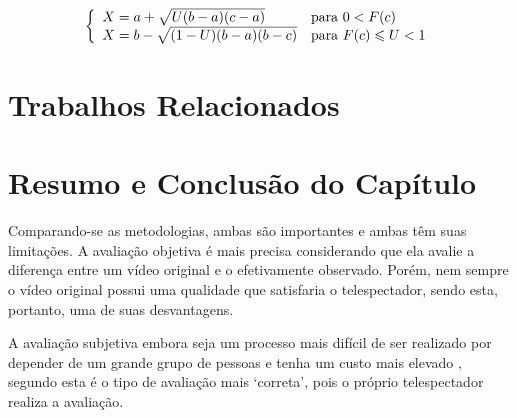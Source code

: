 \[\left\{\begin{array}{l l}
X = a +\sqrt{U(b-a)(c-a)} & \mbox{para } 0 < F(c)\\ 
X = b - \sqrt{(1-U)(b-a)(b-c)} & \mbox{para } F(c) \leqslant U < 1
\end{array}\right.\]

\section{Trabalhos Relacionados}

\section{Resumo e Conclusão do Capítulo}


Comparando-se as metodologias, ambas são importantes e ambas têm suas limitações. A avaliação objetiva é mais precisa considerando que ela avalie a diferença entre um vídeo original e o efetivamente observado. Porém, nem sempre o vídeo original possui uma qualidade que satisfaria o telespectador, sendo esta, portanto, uma de suas desvantagens.

A avaliação subjetiva embora seja um processo mais difícil de ser realizado por depender de um grande grupo de pessoas e tenha um custo mais elevado \cite{albini}, segundo \cite{wangbovik2004} esta é o tipo de avaliação mais ‘correta’, pois o próprio telespectador realiza a avaliação.
